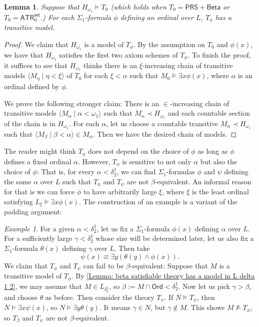 \documentclass{amsart}
\newtheorem{lemma}[theorem]{Lemma}
\theoremstyle{remark}
\newtheorem{example}[example]{Example}
\newcommand{\PRS}{\mathsf{PRS}}
\newcommand{\Beta}{\mathsf{Beta}}
\newcommand{\ATR}{\mathsf{ATR}}
\newcommand{\set}{\mathsf{set}}
\newcommand{\Ord}{\mathsf{Ord}}
\begin{document}
\begin{lemma}
    Suppose that $H_{\omega_1}\vDash T_0$ (which holds when $T_0 = \PRS+\Beta$ or $T_0 = \ATR_0^\set$.)
    For each $\Sigma_1$-formula $\phi$ defining an ordinal over $L$, $T_\phi$ has a transitive model.
\end{lemma}
\begin{proof}
    We claim that $H_{\omega_1}$ is a model of $T_\phi$. By the assumption on $T_0$ and $\phi(x)$, we have that $H_{\omega_1}$ satisfies the first two axiom schemes of $T_\phi$. To finish the proof, it suffices to see that $H_{\omega_1}$ thinks there is an $\xi$-increasing chain of transitive models $\langle M_\eta\mid \eta<\xi\rangle$ of $T_0$ for each $\xi<\alpha$ such that $M_0\vDash \exists x \phi(x)$, where $\alpha$ is an ordinal defined by $\phi$.

    We prove the following stronger claim: There is an $\in$-increasing chain of transitive models $\langle M_\alpha \mid \alpha<\omega_1\rangle$ such that $M_\alpha \prec H_{\omega_1}$ and each countable section of the chain is in $H_{\omega_1}$.
    For each $\alpha$, let us choose a countable transitive $M_\alpha \prec H_{\omega_1}$ such that $\langle M_\beta\mid \beta<\alpha\rangle \in M_\alpha$. Then we have the desired chain of models.
\end{proof}

The reader might think $T_\phi$ does not depend on the choice of $\phi$ as long as $\phi$ defines a fixed ordinal $\alpha$. However, $T_\phi$ is sensitive to not only $\alpha$ but also the choice of $\phi$: That is, for every $\alpha<\delta^1_2$, we can find $\Sigma_1$-formulas $\phi$ and $\psi$ defining the same $\alpha$ over $L$ such that $T_\phi$ and $T_\psi$ are not $\beta$-equivalent. An informal reason for that is we can force $\phi$ to have arbitrarily large $\xi$, where $\xi$ is the least ordinal satisfying $L_\xi\vDash \exists x\phi(x)$. The construction of an example is a variant of the padding argument:

\begin{example}
    For a given $\alpha<\delta^1_2$, let us fix a $\Sigma_1$-formula $\phi(x)$ defining $\alpha$ over $L$.
    For a sufficiently large $\gamma < \delta^1_2$ whose size will be determined later, let us also fix a $\Sigma_1$-formula $\theta(x)$ defining $\gamma$ over $L$.
    Then take
    \begin{equation*}
        \psi(x) \equiv \exists y(\theta(y)\land \phi(x)).
    \end{equation*}
    We claim that $T_\phi$ and $T_\psi$ can fail to be $\beta$-equivalent: Suppose that $M$ is a transitive model of $T_\phi$. 
    By \autoref{Lemma: beta satisfiable theory has a model in L delta 1 2}, we may assume that $M\in L_{\delta^1_2}$, so $\beta := M\cap \Ord< \delta^1_2$.
    Now let us pick $\gamma>\beta$, and choose $\theta$ as before. Then consider the theory $T_\psi$.
    If $N\vDash T_\psi$, then $N\vDash \exists x \psi(x)$, so $N\vDash \exists y \theta(y)$. It means $\gamma\in N$, but $\gamma\notin M$. This shows $M\nvDash T_\phi$, so $T_\beta$ and $T_\psi$ are not $\beta$-equivalent.
\end{example}
\end{document}
